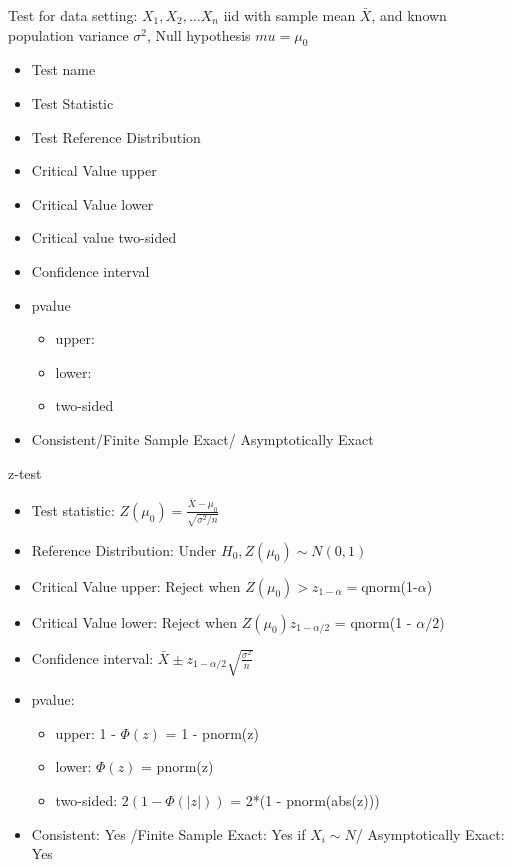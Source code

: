 \documentclass[12pt]{article}
\begin{document}
\begin{note}
    \begin{field}
        Test for data setting: $X_1, X_2, \ldots X_n$ iid with sample mean $\bar{X}$, and known population variance $\sigma^2$, Null hypothesis $mu = \mu_0$
        
            \begin{itemize}
              \item Test name
              \item Test Statistic
              \item Test Reference Distribution
              \item Critical Value upper
              \item Critical Value lower
              \item Critical value two-sided
              \item Confidence interval
              \item pvalue
              \begin{itemize}
                \item upper:
                \item lower:
                \item two-sided
              \end{itemize}
              \item Consistent/Finite Sample Exact/ Asymptotically Exact
            \end{itemize}
    \end{field}
    \begin{field}
        z-test
            \begin{itemize}
              \item Test statistic: $Z(\mu_0) = \frac{\bar{X} - \mu_0}{\sqrt{\sigma^2/n}}$
              \item Reference Distribution: Under $H_0, Z(\mu_0) \sim N(0,1)$
              \item Critical Value upper: Reject when $Z(\mu_0) > z_{1 - \alpha} = $qnorm(1-$\alpha$)
              \item Critical Value lower: Reject when $Z(\mu_0) z_{1 - \alpha/2}$ = qnorm(1 - $\alpha/2$)
              \item Confidence interval: $ \bar{X} \pm z_{1 - \alpha/2}\sqrt{\frac{\sigma^2}{n}}$
              \item pvalue:
              \begin{itemize}
                \item upper: 1 - $\Phi(z)$ = 1 - pnorm(z)
                \item lower: $\Phi(z)$ = pnorm(z)
                \item two-sided: $2(1 - \Phi(|z|))$ = 2*(1 - pnorm(abs(z)))
              \end{itemize}
              \item Consistent: Yes /Finite Sample Exact: Yes if $X_i \sim N$/ Asymptotically Exact: Yes
            \end{itemize}
    \end{field}
\end{note}
\end{document}
